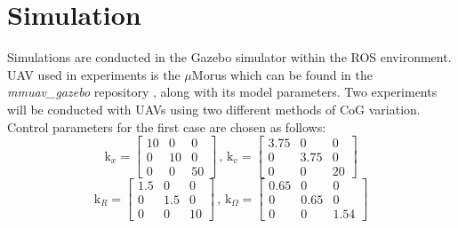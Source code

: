 \section{Simulation}
Simulations are conducted in the Gazebo simulator within the ROS environment. UAV used in experiments is the $\mu$Morus which can be found in the \textit{mmuav\_gazebo} repository \cite{gitLink}, along with its model parameters. Two experiments will be conducted with UAVs using two different methods of CoG variation.
Control parameters for the first case are chosen as follows:
\begin{equation*}
	\text{k}_x = 
	\begin{bmatrix}
		10 &  0  &  0 \\
		 0 & 10  &	0 \\ 
		 0 &  0  & 50 	
	\end{bmatrix}
	\, , \,	
	\text{k}_v =
	\begin{bmatrix}
		3.75 & 0 & 0 \\
		0 & 3.75 & 0 \\
		0 & 0 & 20
	\end{bmatrix}
\end{equation*}
\begin{equation*}
	\text{k}_R = 
	\begin{bmatrix}
		1.5 & 0 & 0 \\
		0 & 1.5 & 0 \\
		0 & 0 & 10
	\end{bmatrix}
	\, , \,
	\text{k}_\Omega = 
	\begin{bmatrix}
		0.65 & 0 & 0 \\
		0 & 0.65 & 0 \\
		0 & 0 & 1.54
	\end{bmatrix}
\end{equation*}

